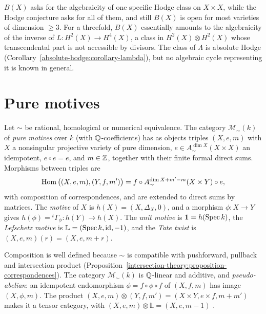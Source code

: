 \begin{remark}\label{standard-conjectures:remark-weakness}
$B(X)$ asks for the algebraicity of one specific Hodge class on $X \times X$, while the Hodge conjecture asks for all of them, and still $B(X)$ is open for most varieties of dimension $\geq 3$. For a
threefold, $B(X)$ essentially amounts to the algebraicity of the inverse of $L \colon H^2(X) \to H^4(X)$, a class in $H^2(X) \otimes H^2(X)$ whose transcendental part is not accessible by divisors. The class of $\Lambda$ is absolute
Hodge (Corollary~\ref{absolute-hodge:corollary-lambda}), but no algebraic cycle representing it is known in general.
\end{remark}

\section{Pure motives}\label{standard-conjectures:section-motives}

\begin{definition}\label{standard-conjectures:definition-motives}
Let $\sim$ be rational, homological or numerical equivalence. The category $\mathcal{M}_\sim(k)$ of \emph{pure motives} over $k$ (with $\mathbb{Q}$-coefficients) has as objects triples $(X, e, m)$ with $X$ a
nonsingular projective variety of pure dimension, $e \in A^{\dim X}_\sim(X \times X)$ an idempotent, $e \circ e = e$, and $m \in \mathbb{Z}$, together with their finite formal direct sums. Morphisms between triples are
\[
\operatorname{Hom}\big((X, e, m), (Y, f, m')\big) = f \circ A^{\dim X + m' - m}_\sim(X \times Y) \circ e,
\]
with composition of correspondences, and are extended to direct sums by matrices. The \emph{motive} of $X$ is $h(X) = (X, \Delta_X, 0)$, and a morphism $\phi \colon X \to Y$ gives
$h(\phi) = {}^t\Gamma_\phi \colon h(Y) \to h(X)$. The \emph{unit motive} is $\mathbf{1} = h(\operatorname{Spec} k)$, the \emph{Lefschetz motive} is $\mathbb{L} = (\operatorname{Spec} k, \mathrm{id}, -1)$, and the \emph{Tate twist} is
$(X, e, m)(r) = (X, e, m + r)$.
\end{definition}

Composition is well defined because $\sim$ is compatible with pushforward, pullback and intersection product (Proposition~\ref{intersection-theory:proposition-correspondences}). The category
$\mathcal{M}_\sim(k)$ is $\mathbb{Q}$-linear and additive, and \emph{pseudo-abelian}: an idempotent endomorphism $\phi = f \circ \phi \circ f$ of $(X, f, m)$ has image $(X, \phi, m)$. The product
$(X, e, m) \otimes (Y, f, m') = (X \times Y, e \times f, m + m')$ makes it a tensor category, with $(X, e, m) \otimes \mathbb{L} = (X, e, m - 1)$ \cite{scholl-1994}.

